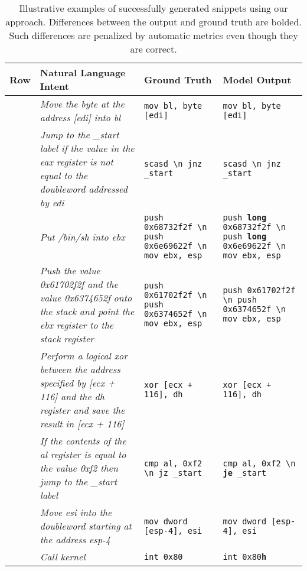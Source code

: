 \begin{table*}[t]
\centering
\caption{Illustrative examples of successfully generated snippets using our approach. Differences between the output and ground truth are bolded. Such differences are penalized by automatic metrics even though they are correct.}
\label{tab:successful_cases}
\begin{tabular}{
>{\centering\arraybackslash}m{0.75cm}|
 >{\centering\arraybackslash}m{3.5cm}|
 >{\centering\arraybackslash}m{3cm}|
 >{\centering\arraybackslash}m{3cm}}
\toprule
\textbf{Row} & \textbf{Natural Language Intent} & \textbf{Ground Truth} & \textbf{Model Output}\\
\midrule
1 & \textit{Move the byte at the address [edi] into bl} & \texttt{mov bl, byte [edi]} & \texttt{mov bl, byte [edi]} \\
\midrule
2 & \textit{Jump to the \_start label if the value in the eax register is not equal to the doubleword addressed by edi} & \texttt{scasd \textbackslash{n} jnz \_start} &	\texttt{scasd \textbackslash{n} jnz \_start} \\
\midrule
3 & \textit{Put /bin/sh into ebx} & \texttt{push 0x68732f2f \textbackslash{n} push 0x6e69622f \textbackslash{n} mov ebx, esp} &\texttt{push \textbf{long} 0x68732f2f \textbackslash{n} push \textbf{long} 0x6e69622f \textbackslash{n} mov ebx, esp} \\
\midrule
4 & \textit{Push the value 0x61702f2f and the value 0x6374652f onto the stack and point the ebx register to the stack register} & \texttt{push 0x61702f2f \textbackslash{n} push 0x6374652f \textbackslash{n} mov ebx, esp} & \texttt{push 0x61702f2f \textbackslash{n} push 0x6374652f \textbackslash{n} mov ebx, esp} \\
\midrule
5 & \textit{Perform a logical xor between the address specified by [ecx + 116] and the dh register and save the result in [ecx + 116]} & \texttt{xor [ecx + 116], dh} & \texttt{xor [ecx + 116], dh} \\
\midrule
6 & \textit{If the contents of the al register is equal to the value 0xf2 then jump to the \_start label} & \texttt{cmp al, 0xf2 \textbackslash{n} jz \_start} & \texttt{cmp al, 0xf2 \textbackslash{n} \textbf{je} \_start} \\
\midrule
7 & \textit{Move esi into the doubleword starting at the address esp-4} & \texttt{mov dword [esp-4], esi} & \texttt{mov dword [esp-4], esi} \\
\midrule
8 & \textit{Call kernel}	& \texttt{int 0x80} & \texttt{int 0x80\textbf{h}} \\
\bottomrule
\end{tabular}
\end{table*}


